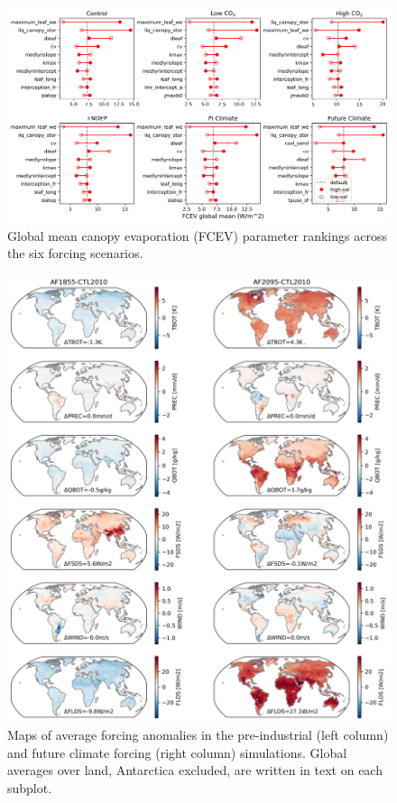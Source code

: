 \documentclass[11pt]{article}
\begin{document}
\begin{figure}[h]
\centering
\includegraphics[width=\textwidth]{figs/supp/FCEV_global_mean.png}
\caption{Global mean canopy evaporation (FCEV) parameter rankings across the six forcing scenarios.}
\label{supp:fcev}
\end{figure}

\begin{figure}[h]
\centering
\includegraphics[width=\textwidth]{figs/supp/anomalies.png}
\caption{Maps of average forcing anomalies in the pre-industrial (left column) and future climate forcing (right column) simulations. Global averages over land, Antarctica excluded, are written in text on each subplot.}
\label{supp:anomalies}
\end{figure}
\end{document}
